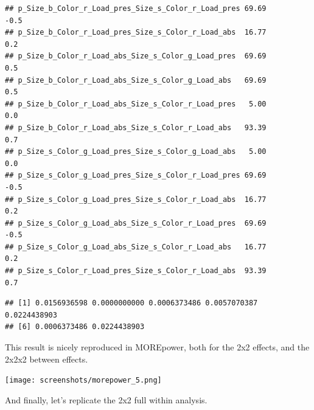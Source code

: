 \documentclass[
]{book}
\newenvironment{Shaded}{\begin{snugshade}}{\end{snugshade}}
\newcommand{\NormalTok}[1]{#1}
\newcommand{\SpecialCharTok}[1]{\textcolor[rgb]{0.00,0.00,0.00}{#1}}
\begin{document}
\begin{verbatim}
## p_Size_b_Color_r_Load_pres_Size_s_Color_r_Load_pres 69.69        -0.5
## p_Size_b_Color_r_Load_pres_Size_s_Color_r_Load_abs  16.77         0.2
## p_Size_b_Color_r_Load_abs_Size_s_Color_g_Load_pres  69.69         0.5
## p_Size_b_Color_r_Load_abs_Size_s_Color_g_Load_abs   69.69         0.5
## p_Size_b_Color_r_Load_abs_Size_s_Color_r_Load_pres   5.00         0.0
## p_Size_b_Color_r_Load_abs_Size_s_Color_r_Load_abs   93.39         0.7
## p_Size_s_Color_g_Load_pres_Size_s_Color_g_Load_abs   5.00         0.0
## p_Size_s_Color_g_Load_pres_Size_s_Color_r_Load_pres 69.69        -0.5
## p_Size_s_Color_g_Load_pres_Size_s_Color_r_Load_abs  16.77         0.2
## p_Size_s_Color_g_Load_abs_Size_s_Color_r_Load_pres  69.69        -0.5
## p_Size_s_Color_g_Load_abs_Size_s_Color_r_Load_abs   16.77         0.2
## p_Size_s_Color_r_Load_pres_Size_s_Color_r_Load_abs  93.39         0.7
\end{verbatim}

\begin{Shaded}
\end{Shaded}

\begin{verbatim}
## [1] 0.0156936598 0.0000000000 0.0006373486 0.0057070387 0.0224438903
## [6] 0.0006373486 0.0224438903
\end{verbatim}

This result is nicely reproduced in MOREpower, both for the 2x2 effects, and the 2x2x2 between effects.

\texttt{[image: screenshots/morepower\_5.png]}

And finally, let's replicate the 2x2 full within analysis.
\end{document}
